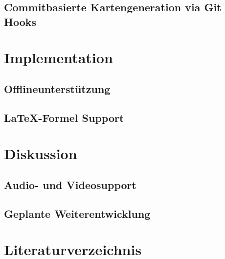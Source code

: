 \documentclass{article}
\begin{document}
\subsection{Commitbasierte Kartengeneration via Git Hooks}
\section{Implementation}
\subsection{Offlineunterst\"utzung}
\subsection{\LaTeX-Formel Support}
\section{Diskussion}
\subsection{Audio- und Videosupport}
\subsection{Geplante Weiterentwicklung}
\section{Literaturverzeichnis}
\printbibliography
\end{document}
